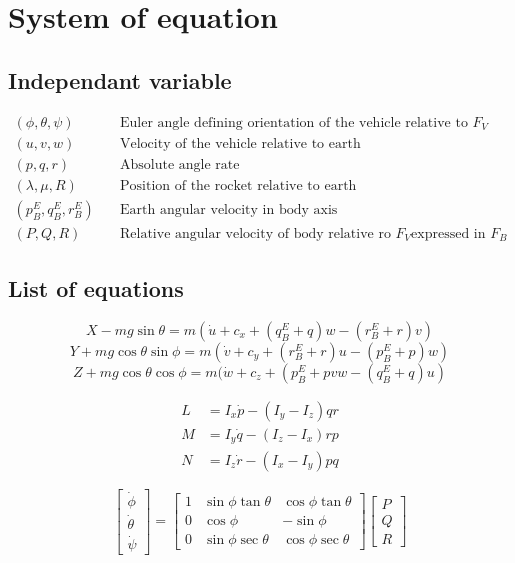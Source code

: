 \documentclass[10pt]{article}
\begin{document}
\section{System of equation}

\subsection{Independant variable}

\begin{align*}
(\phi, \theta, \psi)\quad & \text{Euler angle defining orientation of the
vehicle relative to $F_V$}\\
(u, v, w)\quad & \text{Velocity of the vehicle relative to earth}\\
(p, q, r)\quad & \text{Absolute angle rate}\\
(\lambda, \mu, R)\quad & \text{Position of the rocket relative to earth}\\
(p^E_B, q^E_B, r^E_B)\quad & \text{Earth angular velocity in body axis}\\
(P, Q, R) \quad & \text{Relative angular velocity of body relative ro $F_V$
expressed in $F_B$}
\end{align*}

\subsection{List of equations}

$$X - mg\sin{\theta} = m(\dot{u} + c_x + (q^E_B+q)w - (r^E_B+r)v)$$
$$Y + mg\cos{\theta}\sin{\phi} = m(\dot{v} + c_y + (r^E_B+r)u - (p^E_B+p)w)$$
$$Z + mg\cos{\theta}\cos{\phi} = m(\dot{w} + c_z + (p^E_B+pvw -
(q^E_B+q)u)$$

\begin{align*}
L & = I_x\dot{p} - (I_y - I_z)qr\\
M & = I_y\dot{q} - (I_z - I_x)rp\\
N & = I_z\dot{r} - (I_x - I_y)pq
\end{align*}

$$\begin{bmatrix}\dot{\phi}\\\dot{\theta}\\\dot{\psi}\end{bmatrix} = 
  \begin{bmatrix}1&\sin{\phi}\tan{\theta}&\cos{\phi}\tan{\theta}\\
                 0&\cos{\phi}&-\sin{\phi}\\
                 0&\sin{\phi}\sec{\theta}&\cos{\phi}\sec{\theta}\end{bmatrix}
  \begin{bmatrix}P\\Q\\R\end{bmatrix}$$
\end{document}
